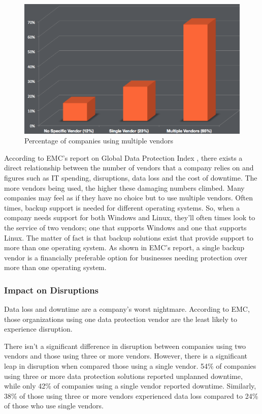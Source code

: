 \begin{figure}[t]
    \begin{center}
        \includegraphics[scale=0.3]{images/graph1.png}
    \end{center}
    \caption{Percentage of companies using multiple vendors}
    \label{fig:graph1}
\end{figure}

According to EMC's report on Global Data Protection Index %
, there exists a direct relationship between the number of vendors that
a company relies on and figures such as IT spending, disruptions, data
loss and the cost of downtime. The more vendors being used, the higher
these damaging numbers climbed. Many companies may feel as if they have
no choice but to use multiple vendors. Often times, backup support is
needed for different operating systems. So, when a company needs support
for both Windows and Linux, they'll often times look to the service of
two vendors; one that supports Windows and one that supports Linux. The
matter of fact is that backup solutions exist that provide support to
more than one operating system. As shown in EMC's report, a single
backup vendor is a financially preferable option for businesses needing
protection over more than one operating system.


\subsubsection{Impact on Disruptions}

Data loss and downtime are a company's worst nightmare. According to
EMC, those organizations using one data protection vendor are the least
likely to experience disruption.

There isn't a significant difference in disruption between companies
using two vendors and those using three or more vendors. However, there
is a significant leap in disruption when compared those using a single
vendor. 54\% of companies using three or more data protection solutions
reported unplanned downtime, while only 42\% of companies using a single
vendor reported downtime. Similarly, 38\% of those using three or more
vendors experienced data loss compared to 24\% of those who use single
vendors.  

